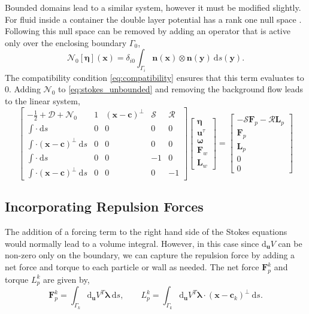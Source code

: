 \documentclass[preprint, 10pt]{elsarticle}
\begin{document}
Bounded domains lead to a similar system, however it must be modified slightly. For fluid inside a container the double layer potential has a rank one null space \cite{Ladyzhenskaya1963}. Following \cite{Power1993} this null space can be removed by adding an operator that is active only over the enclosing boundary $\Gamma_0$,
\[ \mathcal{N}_0[\pmb{\eta}](\mathbf{x}) = \delta_{i0} \int_{\Gamma_i}\mathbf{n}(\mathbf{x})\otimes\mathbf{n}(\mathbf{y})~\text{d}s(\mathbf{y}).\]
The compatibility condition \eqref{eq:compatibility} ensures that this term evaluates to 0. Adding $\mathcal{N}_0$ to \eqref{eq:stokes_unbounded} and removing the background flow leads to the linear system,
\begin{equation}\label{eq:stokes_bounded} \begin{bmatrix} -\frac{1}{2} + \mathcal{D} + \mathcal{N}_0 & 1 & (\mathbf{x}-\mathbf{c})^\perp & \mathcal{S} & \mathcal{R}\\
		\int \cdot~ \text{d}s & 0 & 0 & 0 & 0\\
		\int\cdot(\mathbf{x}-\mathbf{c})^\perp~\text{d}s & 0 & 0 & 0 & 0\\
		\int \cdot~ \text{d}s & 0 & 0 & - 1 & 0\\
		\int\cdot(\mathbf{x}-\mathbf{c})^\perp~\text{d}s & 0 & 0 & 0 & -1\end{bmatrix}
\begin{bmatrix}
	\pmb{\eta}\\\mathbf{u}^\tau \\ \pmb{\omega} \\ \mathbf{F}_w \\\mathbf{ L}_w
\end{bmatrix}
=
\begin{bmatrix}
	 - \mathcal{S}\mathbf{F}_p - \mathcal{R}\mathbf{L}_p\\
	\mathbf{F}_p\\
	\mathbf{L}_p\\
	0\\
	0
\end{bmatrix}
\end{equation}

\subsection{Incorporating Repulsion Forces}

The addition of a forcing term to the right hand side of the Stokes equations would normally lead to a volume integral. However, in this case since $\text{d}_{\mathbf{u}} V$ can be non-zero only on the boundary, we can capture the repulsion force by adding a net force and torque to each particle or wall as needed. The net force $\mathbf{F}^k_p$ and torque $L^k_p$ are given by,
\[ \mathbf{F}^k_p = \int_{\Gamma_k} \text{d}_\mathbf{u}V^T\pmb{\lambda}~\text{d}s, \qquad L_p^k = \int_{\Gamma_k}  \text{d}_\mathbf{u}V^T\pmb{\lambda}\cdot(\mathbf{x}-\mathbf{c}_k)^\perp~\text{d}s.\]
		
\end{document}
